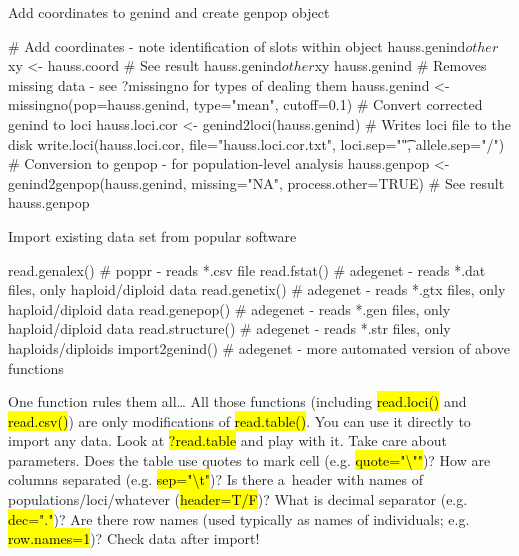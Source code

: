 \documentclass[compress, ucs, xelatex, 11pt, xcolor=svgnames,
  hyperref={
    bookmarks=true,
    unicode=true,
    colorlinks=true,
    pdftitle={Molecular data in R},
    plainpages=false,
    pdfauthor={Vojtech Zeisek},
    pdfsubject={Course about phylogeny and evolution in R},
    pdfcreator={XeLaTeX},
    pdfkeywords={R, evolution, phylogeny, molecular data},
    linkcolor=Tomato,
    anchorcolor=SaddleBrown,
    citecolor=Goldenrod,
    filecolor=DarkMagenta,
    menucolor=Sienna,
    urlcolor=DarkTurquoise,
    pdftex},
  url={hyphens, lowtilde} %
  ]{beamer}
\renewcommand{\texttt}[1]{\hl{\ttfamily #1}}
\begin{document}
\begin{frame}[fragile]{Add coordinates to genind and create genpop object}
  \begin{spluscode}
    # Add coordinates - note identification of slots within object
    hauss.genind$other$xy <- hauss.coord
    # See result
    hauss.genind$other$xy
    hauss.genind
    # Removes missing data - see ?missingno for types of dealing them
    hauss.genind <- missingno(pop=hauss.genind, type="mean", cutoff=0.1)
    # Convert corrected genind to loci
    hauss.loci.cor <- genind2loci(hauss.genind)
    # Writes loci file to the disk
    write.loci(hauss.loci.cor, file="hauss.loci.cor.txt",
      loci.sep="\t", allele.sep="/")
    # Conversion to genpop - for population-level analysis
    hauss.genpop <- genind2genpop(hauss.genind, missing="NA",
      process.other=TRUE)
    # See result
    hauss.genpop
  \end{spluscode}
\end{frame}

\begin{frame}[fragile]{Import existing data set from popular software}
  \begin{spluscode}
    read.genalex() # poppr - reads *.csv file
    read.fstat() # adegenet - reads *.dat files, only haploid/diploid data
    read.genetix() # adegenet - reads *.gtx files, only haploid/diploid data
    read.genepop() # adegenet - reads *.gen files, only haploid/diploid data
    read.structure() # adegenet - reads *.str files, only haploids/diploids
    import2genind() # adegenet - more automated version of above functions
  \end{spluscode}
\begin{block}{One function rules them all\ldots}
  All those functions (including \texttt{read.loci()} and \texttt{read.csv()}) are only modifications of \texttt{read.table()}. You can use it directly to import any data. Look at \texttt{?read.table} and play with it. Take care about parameters. Does the table use quotes to mark cell (e.g. \texttt{quote="\textbackslash ""})? How are columns separated (e.g. \texttt{sep="\textbackslash t"})? Is there a~header with names of populations/loci/whatever (\texttt{header=T/F})? What is decimal separator (e.g. \texttt{dec="."})? Are there row names (used typically as names of individuals; e.g. \texttt{row.names=1})? Check data after import!
\end{block}
\end{frame}
\end{document}
